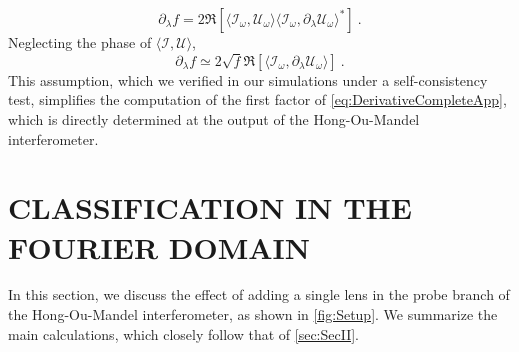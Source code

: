 \documentclass[reprint,
superscriptaddress,
nofootinbib,
aps,
pra,
showkeys
]{revtex4-2}
\newcommand{\I}{\mathcal{I}}
\newcommand{\U}{\mathcal{U}}
\newcommand{\f}{f}
\begin{document}
\begin{widetext}
\begin{equation}
	\partial_\lambda \f = 2 \Re \left[ \langle \I_{\omega}, \U_{\omega} \rangle \langle \I_{\omega}, \partial_{\lambda}\U_{\omega} \rangle^* \right] \ .
	\label{eq:DerivativeCompleteApp}
\end{equation}	
Neglecting the phase of $\langle \I, \U \rangle$,
\begin{equation}
	\partial_\lambda \f \simeq 2 \sqrt{f} \Re \left[ \langle \I_{\omega}, \partial_{\lambda}\U_{\omega} \rangle \right] \ .
	\label{eq:DerivativeApproximation}
\end{equation}
This assumption, which we verified in our simulations under a self-consistency test, simplifies the computation of the first factor of \cref{eq:DerivativeCompleteApp}, which is directly determined at the output of the Hong-Ou-Mandel interferometer.

\section{CLASSIFICATION IN THE FOURIER DOMAIN\label{app:Fourier}}
In this section, we discuss the effect of adding a single lens in the probe branch of the Hong-Ou-Mandel interferometer, as shown in \cref{fig:Setup}. We summarize the main calculations, which closely follow that of \cref{sec:SecII}.


\end{widetext}
\end{document}
